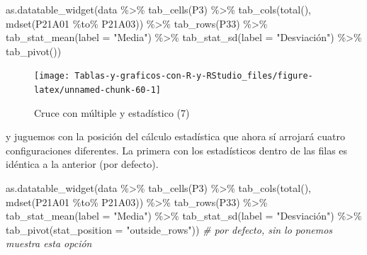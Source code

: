 \documentclass[
]{book}
\newenvironment{Shaded}{\begin{snugshade}}{\end{snugshade}}
\newcommand{\AttributeTok}[1]{\textcolor[rgb]{0.77,0.63,0.00}{#1}}
\newcommand{\CommentTok}[1]{\textcolor[rgb]{0.56,0.35,0.01}{\textit{#1}}}
\newcommand{\FunctionTok}[1]{\textcolor[rgb]{0.00,0.00,0.00}{#1}}
\newcommand{\NormalTok}[1]{#1}
\newcommand{\SpecialCharTok}[1]{\textcolor[rgb]{0.00,0.00,0.00}{#1}}
\newcommand{\StringTok}[1]{\textcolor[rgb]{0.31,0.60,0.02}{#1}}
\begin{document}
\begin{Shaded}
\begin{Highlighting}[]
\FunctionTok{as.datatable\_widget}\NormalTok{(data }\SpecialCharTok{\%\textgreater{}\%}
  \FunctionTok{tab\_cells}\NormalTok{(P3) }\SpecialCharTok{\%\textgreater{}\%}
  \FunctionTok{tab\_cols}\NormalTok{(}\FunctionTok{total}\NormalTok{(), }\FunctionTok{mdset}\NormalTok{(P21A01 }\SpecialCharTok{\%to\%}\NormalTok{ P21A03)) }\SpecialCharTok{\%\textgreater{}\%}
  \FunctionTok{tab\_rows}\NormalTok{(P33) }\SpecialCharTok{\%\textgreater{}\%}
  \FunctionTok{tab\_stat\_mean}\NormalTok{(}\AttributeTok{label =} \StringTok{"Media"}\NormalTok{) }\SpecialCharTok{\%\textgreater{}\%}
  \FunctionTok{tab\_stat\_sd}\NormalTok{(}\AttributeTok{label =} \StringTok{"Desviación"}\NormalTok{) }\SpecialCharTok{\%\textgreater{}\%}
  \FunctionTok{tab\_pivot}\NormalTok{())}
\end{Highlighting}
\end{Shaded}

\begin{figure}[H]

{\centering \texttt{[image: Tablas-y-graficos-con-R-y-RStudio\_files/figure-latex/unnamed-chunk-60-1]} 

}

\caption{Cruce con múltiple y estadístico (7)}\label{fig:unnamed-chunk-60}
\end{figure}

y juguemos con la posición del cálculo estadística que ahora sí arrojará cuatro configuraciones diferentes. La primera con los estadísticos dentro de las filas es idéntica a la anterior (por defecto).

\begin{Shaded}
\begin{Highlighting}[]
\FunctionTok{as.datatable\_widget}\NormalTok{(data }\SpecialCharTok{\%\textgreater{}\%}
  \FunctionTok{tab\_cells}\NormalTok{(P3) }\SpecialCharTok{\%\textgreater{}\%}
  \FunctionTok{tab\_cols}\NormalTok{(}\FunctionTok{total}\NormalTok{(), }\FunctionTok{mdset}\NormalTok{(P21A01 }\SpecialCharTok{\%to\%}\NormalTok{ P21A03)) }\SpecialCharTok{\%\textgreater{}\%}
  \FunctionTok{tab\_rows}\NormalTok{(P33) }\SpecialCharTok{\%\textgreater{}\%}
  \FunctionTok{tab\_stat\_mean}\NormalTok{(}\AttributeTok{label =} \StringTok{"Media"}\NormalTok{) }\SpecialCharTok{\%\textgreater{}\%}
  \FunctionTok{tab\_stat\_sd}\NormalTok{(}\AttributeTok{label =} \StringTok{"Desviación"}\NormalTok{) }\SpecialCharTok{\%\textgreater{}\%}
  \FunctionTok{tab\_pivot}\NormalTok{(}\AttributeTok{stat\_position =} \StringTok{"outside\_rows"}\NormalTok{))  }\CommentTok{\# por defecto, sin lo ponemos muestra esta opción}
\end{Highlighting}
\end{Shaded}
\end{document}

